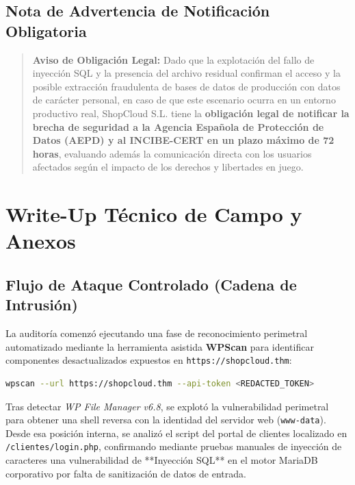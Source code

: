 \documentclass[11pt,a4paper]{report}
\begin{document}
\section*{Nota de Advertencia de Notificación Obligatoria}
\begin{quote}
\textbf{Aviso de Obligación Legal:} Dado que la explotación del fallo de inyección SQL y la presencia del archivo residual confirman el acceso y la posible extracción fraudulenta de bases de datos de producción con datos de carácter personal, en caso de que este escenario ocurra en un entorno productivo real, ShopCloud S.L. tiene la \textbf{obligación legal de notificar la brecha de seguridad a la Agencia Española de Protección de Datos (AEPD) y al INCIBE-CERT en un plazo máximo de 72 horas}, evaluando además la comunicación directa con los usuarios afectados según el impacto de los derechos y libertades en juego.
\end{quote}

\newpage

\chapter{Write-Up Técnico de Campo y Anexos}

\section{Flujo de Ataque Controlado (Cadena de Intrusión)}
La auditoría comenzó ejecutando una fase de reconocimiento perimetral automatizado mediante la herramienta asistida \textbf{WPScan} para identificar componentes desactualizados expuestos en \texttt{https://shopcloud.thm}:
\begin{lstlisting}[language=bash]
wpscan --url https://shopcloud.thm --api-token <REDACTED_TOKEN>
\end{lstlisting}

Tras detectar \textit{WP File Manager v6.8}, se explotó la vulnerabilidad perimetral para obtener una shell reversa con la identidad del servidor web (\texttt{www-data}). Desde esa posición interna, se analizó el script del portal de clientes localizado en \texttt{/clientes/login.php}, confirmando mediante pruebas manuales de inyección de caracteres una vulnerabilidad de **Inyección SQL** en el motor MariaDB corporativo por falta de sanitización de datos de entrada.
\end{document}

